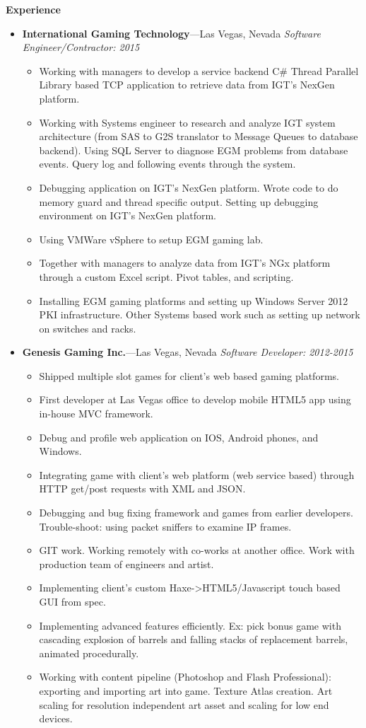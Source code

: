 \documentclass[10pt,oneside]{report}
\newenvironment{ressection}[1]{
	\vspace{1pt}
  {\normalsize\textbf{#1}}
  
  \begin{itemize}
  \vspace{1pt}
}{
 	\end{itemize}
}
\newcommand{\ressubitem}[1]{
	\vspace{-1pt}
	\item \begin{flushleft} #1 \end{flushleft}
}
\newcommand{\resbigitem}[3]{
	\vspace{1pt}
  \small
  \item
  \textbf{#1}---#2 
  \textit{#3}
}
\newenvironment{ressubsec}[3]{
	\resbigitem{#1}{#2}{#3}
  \vspace{-2pt}
	\begin{itemize}
}{
	\end{itemize}
}
\begin{document}
\begin{ressection}{Experience}
  \begin{ressubsec}{International Gaming Technology}{Las Vegas, Nevada}{Software Engineer/Contractor: 2015}
    \ressubitem{Working with managers to develop a service backend C\# Thread Parallel Library based TCP application to retrieve data from IGT's NexGen platform.}
    \ressubitem{Working with Systems engineer to research and analyze IGT system architecture (from SAS to G2S translator to Message Queues to database backend). Using SQL Server to diagnose EGM problems from database events. Query log and following events through the system.}
    \ressubitem{Debugging application on IGT's NexGen platform. Wrote code to do memory guard and thread specific output. Setting up debugging environment on IGT's NexGen platform.}
    \ressubitem{Using VMWare vSphere to setup EGM gaming lab.}
    \ressubitem{Together with managers to analyze data from IGT's NGx platform through a custom Excel script. Pivot tables, and scripting.}
    \ressubitem{Installing EGM gaming platforms and setting up Windows Server 2012 PKI infrastructure. Other Systems based work such as setting up network on switches and racks.}
    \end{ressubsec}
  \begin{ressubsec}{Genesis Gaming Inc.}{Las Vegas, Nevada}{Software Developer: 2012-2015}
    \ressubitem{Shipped multiple slot games for client's web based gaming platforms.}
    \ressubitem{First developer at Las Vegas office to develop mobile HTML5 app using in-house MVC framework.}
    \ressubitem{Debug and profile web application on IOS, Android phones, and Windows.}
    \ressubitem{Integrating game with client's web platform (web service based) through HTTP get/post requests with XML and JSON.}
    \ressubitem{Debugging and bug fixing framework and games from earlier developers. Trouble-shoot: using packet sniffers to examine IP frames.}
    \ressubitem{GIT work. Working remotely with co-works at another office. Work with production team of engineers and artist.}
    \ressubitem{Implementing client's custom Haxe->HTML5/Javascript touch based GUI from spec.}
    \ressubitem{Implementing advanced features efficiently. Ex: pick bonus game with cascading explosion of barrels and falling stacks of replacement barrels, animated procedurally.}
    \ressubitem{Working with content pipeline (Photoshop and Flash Professional): exporting and importing art into game. Texture Atlas creation. Art scaling for resolution independent art asset and scaling for low end devices.}
  \end{ressubsec}

\end{ressection}
\end{document}
